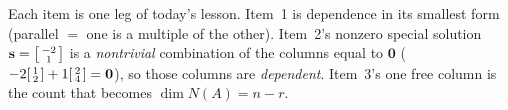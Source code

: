 \documentclass[10pt]{article}
\newcommand{\svec}{\mathbf{s}}
\newcommand{\zero}{\mathbf{0}}
\begin{document}
\begin{teachernote}
Each item is one leg of today's lesson. Item~1 is dependence in its smallest form (parallel $=$ one is a
multiple of the other). Item~2's nonzero special solution $\svec=\begin{bsmallmatrix} -2\\1 \end{bsmallmatrix}$
is a \emph{nontrivial} combination of the columns equal to $\zero$ ($-2\begin{bsmallmatrix} 1\\2 \end{bsmallmatrix}+1\begin{bsmallmatrix} 2\\4 \end{bsmallmatrix}=\zero$), so those columns are \emph{dependent}.
Item~3's one free column is the count that becomes $\dim N(A)=n-r$.
\end{teachernote}
\end{document}
